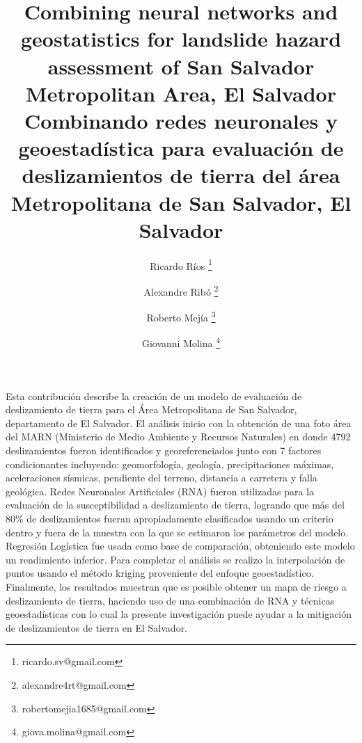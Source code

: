 \documentclass[11pt,twoside]{rmta2010esp}%
\begin{document}
\title{Combining neural networks and geostatistics for landslide hazard assessment of San Salvador Metropolitan Area, El Salvador 
\newline
\newline
Combinando redes neuronales y geoestad\'{i}stica para evaluaci\'{o}n de deslizamientos de tierra del \'{a}rea Metropolitana de San Salvador, El Salvador}

\author[1]{Ricardo R\'{i}os \thanks{ricardo.sv@gmail.com}}
\author[2]{Alexandre Rib\'{o} \thanks{alexandre4rt@gmail.com}}
\author[3]{Roberto Mej\'{i}a \thanks{robertomejia1685@gmail.com}}
\author[4]{Giovanni Molina \thanks{giova.molina@gmail.com}}




\maketitle



\begin{resumen}
Esta contribuci\'{o}n describe la creaci\'{o}n de un modelo de evaluaci\'{o}n de deslizamiento de tierra para el \'{A}rea Metropolitana de San Salvador, departamento de El Salvador. El an\'{a}lisis inicio con la obtenci\'{o}n de una foto \'{a}rea del MARN (Ministerio de Medio Ambiente y Recursos Naturales) en donde 4792 deslizamientos fueron identificados y georeferenciados junto con 7 factores condicionantes incluyendo: geomorfolog\'{i}a, geolog\'{i}a, precipitaciones m\'{a}ximas, aceleraciones s\'{i}smicas, pendiente del terreno, distancia a carretera y falla geol\'{o}gica. Redes Neuronales Artificiales (RNA) fueron utilizadas para la evaluaci\'{o}n de la susceptibilidad a deslizamiento de tierra, logrando que m\'{a}s del 80\% de deslizamientos fueran apropiadamente clasificados usando un criterio dentro y fuera de la muestra con la que se estimaron los par\'{a}metros del modelo. Regresi\'{o}n Log\'{i}stica fue usada como base de comparaci\'{o}n, obteniendo este modelo un rendimiento inferior. Para completar el an\'{a}lisis se realizo la interpolaci\'{o}n de puntos usando el m\'{e}todo kriging proveniente del enfoque geoestad\'{i}stico. Finalmente, los resultados muestran que es posible obtener un mapa de riesgo a deslizamiento de tierra, haciendo uso de una combinaci\'{o}n de RNA y t\'{e}cnicas geoestad\'{i}sticas con lo cual la presente investigaci\'{o}n puede ayudar a la mitigaci\'{o}n de deslizamientos de tierra en El Salvador.
\end{resumen}
\end{document}
